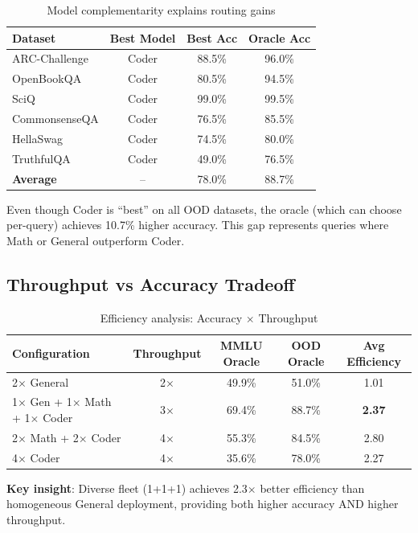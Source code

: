 \documentclass[11pt,a4paper]{article}
\begin{document}
\begin{table}[h]
\centering
\caption{Model complementarity explains routing gains}
\label{tab:complementarity}
\begin{tabular}{lccc}
\toprule
\textbf{Dataset} & \textbf{Best Model} & \textbf{Best Acc} & \textbf{Oracle Acc} \\
\midrule
ARC-Challenge & Coder & 88.5\% & 96.0\% \\
OpenBookQA & Coder & 80.5\% & 94.5\% \\
SciQ & Coder & 99.0\% & 99.5\% \\
CommonsenseQA & Coder & 76.5\% & 85.5\% \\
HellaSwag & Coder & 74.5\% & 80.0\% \\
TruthfulQA & Coder & 49.0\% & 76.5\% \\
\midrule
\textbf{Average} & -- & 78.0\% & 88.7\% \\
\bottomrule
\end{tabular}
\end{table}

Even though Coder is ``best'' on all OOD datasets, the oracle (which can choose per-query) achieves 10.7\% higher accuracy. This gap represents queries where Math or General outperform Coder.

\subsection{Throughput vs Accuracy Tradeoff}

\begin{table}[h]
\centering
\caption{Efficiency analysis: Accuracy $\times$ Throughput}
\label{tab:efficiency}
\begin{tabular}{lcccc}
\toprule
\textbf{Configuration} & \textbf{Throughput} & \textbf{MMLU Oracle} & \textbf{OOD Oracle} & \textbf{Avg Efficiency} \\
\midrule
2$\times$ General & 2$\times$ & 49.9\% & 51.0\% & 1.01 \\
1$\times$ Gen + 1$\times$ Math + 1$\times$ Coder & 3$\times$ & 69.4\% & 88.7\% & \textbf{2.37} \\
2$\times$ Math + 2$\times$ Coder & 4$\times$ & 55.3\% & 84.5\% & 2.80 \\
4$\times$ Coder & 4$\times$ & 35.6\% & 78.0\% & 2.27 \\
\bottomrule
\end{tabular}
\end{table}

\textbf{Key insight}: Diverse fleet (1+1+1) achieves 2.3$\times$ better efficiency than homogeneous General deployment, providing both higher accuracy AND higher throughput.
\end{document}

